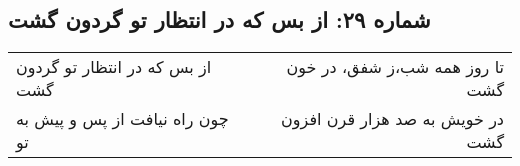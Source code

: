 \begin{center}
\section*{شماره ۲۹: از بس که در انتظار تو گردون گشت}
\label{sec:029}
\begin{longtable}{l p{0.5cm} r}
از بس که در انتظار تو گردون گشت
&&
تا روز همه شب،‌ز شفق، در خون گشت
\\
چون راه نیافت از پس و پیش به تو
&&
در خویش به صد هزار قرن افزون گشت
\\
\end{longtable}
\end{center}
